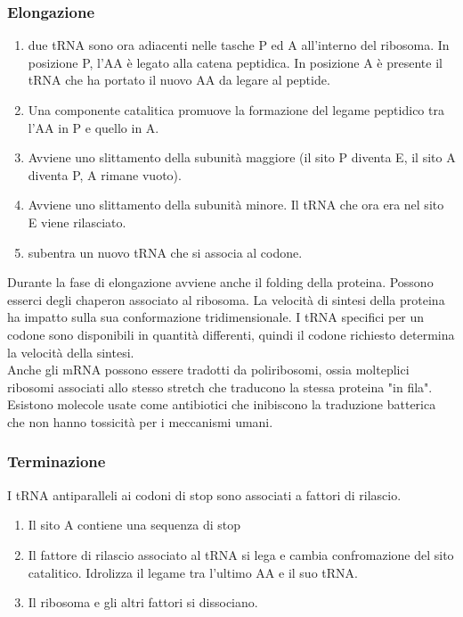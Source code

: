         \subsubsection{Elongazione}
            \begin{enumerate}
                \item due tRNA sono ora adiacenti nelle tasche P ed A all'interno del ribosoma. In posizione P, l'AA è legato alla catena peptidica. In posizione A è presente il tRNA che ha portato il nuovo AA da legare al peptide.
                \item Una componente catalitica promuove la formazione del legame peptidico tra l'AA in P e quello in A. 
                \item Avviene uno slittamento della subunità maggiore (il sito P diventa E, il sito A diventa P, A rimane vuoto). 
                \item Avviene uno slittamento della subunità minore. Il tRNA che ora era nel sito E viene rilasciato.
                \item subentra un nuovo tRNA che si associa al codone.
            \end{enumerate}
            Durante la fase di elongazione avviene anche il folding della proteina. Possono esserci degli chaperon associato al ribosoma. La velocità di sintesi della proteina ha impatto sulla sua conformazione tridimensionale. I tRNA specifici per un codone sono disponibili in quantità differenti, quindi il codone richiesto determina la velocità della sintesi. \\
            Anche gli mRNA possono essere tradotti da poliribosomi, ossia molteplici ribosomi associati allo stesso stretch che traducono la stessa proteina "in fila". Esistono molecole usate come antibiotici che inibiscono la traduzione batterica che non hanno tossicità per i meccanismi umani.
    
        \subsubsection{Terminazione}
            I tRNA antiparalleli ai codoni di stop sono associati a fattori di rilascio.
            \begin{enumerate}
                \item Il sito A contiene una sequenza di stop
                \item Il fattore di rilascio associato al tRNA si lega e cambia confromazione del sito catalitico. Idrolizza il legame tra l'ultimo AA e il suo tRNA. 
                \item Il ribosoma e gli altri fattori si dissociano.
            \end{enumerate}
        
